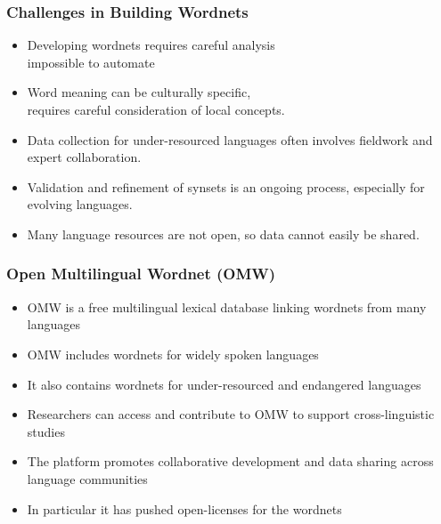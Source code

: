 \documentclass[xetex]{beamer}
\begin{document}
\begin{frame}
\frametitle{Challenges in Building Wordnets}

\begin{itemize}
    \item Developing wordnets requires careful analysis \\ impossible to automate
    \item Word meaning can be culturally specific, \\ requires careful consideration of local concepts.
    \item Data collection for under-resourced languages often involves fieldwork and expert collaboration.
    \item Validation and refinement of synsets is an ongoing process, especially for evolving languages.
    \item Many language resources are not open, so data cannot easily be shared.
\end{itemize}
\end{frame}



\begin{frame}
\frametitle{Open Multilingual Wordnet (OMW)}

\begin{itemize}
    \item OMW is a free multilingual lexical database linking wordnets from many languages \citep{Bond:Foster:2013}
    \item OMW includes wordnets for widely spoken languages
    \item It also contains wordnets for under-resourced and endangered languages
    \item Researchers can access and contribute to OMW to support cross-linguistic studies
    \item The platform promotes collaborative development and data sharing across language communities
    \item In particular it has pushed open-licenses for the wordnets
\end{itemize}
\end{frame}
\end{document}
